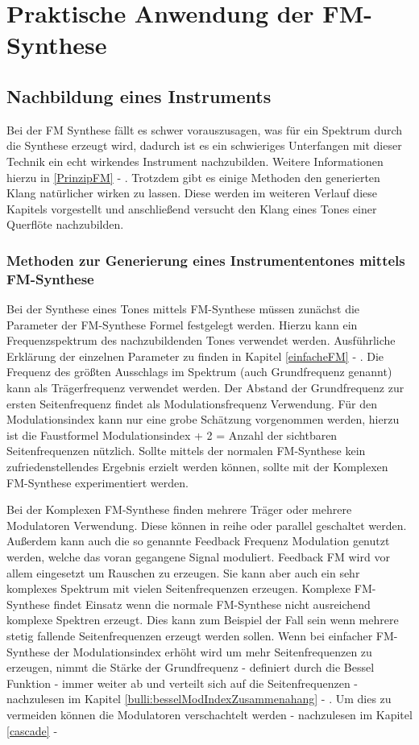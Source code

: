 \section{Praktische Anwendung der FM-Synthese}
\FloatBarrier
\subsection{Nachbildung eines Instruments}
Bei der FM Synthese fällt es schwer vorauszusagen, was für ein Spektrum durch die Synthese erzeugt wird, dadurch ist es ein schwieriges Unterfangen mit dieser Technik ein echt wirkendes Instrument nachzubilden. Weitere Informationen hierzu in \ref{PrinzipFM} - .
Trotzdem gibt es einige Methoden den generierten Klang natürlicher wirken zu lassen. Diese werden im weiteren Verlauf diese Kapitels vorgestellt und anschließend versucht den Klang eines Tones einer Querflöte nachzubilden.

\FloatBarrier
\subsubsection{Methoden zur Generierung eines Instrumententones mittels FM-Synthese}

Bei der Synthese eines Tones mittels FM-Synthese müssen zunächst die Parameter der FM-Synthese Formel festgelegt werden. Hierzu kann ein Frequenzspektrum des nachzubildenden Tones verwendet werden. Ausführliche Erklärung der einzelnen Parameter zu finden in Kapitel \ref{einfacheFM} - . Die Frequenz des größten Ausschlags im Spektrum (auch Grundfrequenz genannt) kann als Trägerfrequenz verwendet werden. Der Abstand der Grundfrequenz zur ersten Seitenfrequenz findet als Modulationsfrequenz Verwendung. Für den Modulationsindex kann nur eine grobe Schätzung vorgenommen werden, hierzu ist die Faustformel Modulationsindex + 2 = Anzahl der sichtbaren Seitenfrequenzen nützlich. Sollte mittels der normalen FM-Synthese kein zufriedenstellendes Ergebnis erzielt werden können, sollte mit der Komplexen FM-Synthese experimentiert werden. 

Bei der Komplexen FM-Synthese finden mehrere Träger oder mehrere Modulatoren Verwendung. Diese können in reihe oder parallel geschaltet werden. Außerdem kann auch die so genannte Feedback Frequenz Modulation genutzt werden, welche das voran gegangene Signal moduliert. \cite[S. 399 f.]{hornerPaper} Feedback FM wird vor allem eingesetzt um Rauschen zu erzeugen. Sie kann aber auch ein sehr komplexes Spektrum mit vielen Seitenfrequenzen erzeugen. Komplexe FM-Synthese findet Einsatz wenn die normale FM-Synthese nicht ausreichend komplexe Spektren erzeugt. Dies kann zum Beispiel der Fall sein wenn mehrere stetig fallende Seitenfrequenzen erzeugt werden sollen. Wenn bei einfacher FM-Synthese der Modulationsindex erhöht wird um mehr Seitenfrequenzen zu erzeugen, nimmt die Stärke der Grundfrequenz - definiert durch die Bessel Funktion - immer weiter ab und verteilt sich auf die Seitenfrequenzen - nachzulesen im Kapitel \ref{bulli:besselModIndexZusammenahang} - . Um dies zu vermeiden können die Modulatoren verschachtelt werden - nachzulesen im Kapitel \ref{cascade} - 

